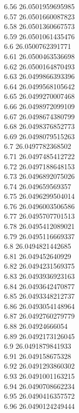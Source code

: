 {6.56	26.0501959695985\\
6.57	26.0501660087823\\
6.58	26.0501360667573\\
6.59	26.0501061435476\\
6.6	26.0500762391771\\
6.61	26.0500463536698\\
6.62	26.0500164870493\\
6.63	26.0499866393396\\
6.64	26.0499568105642\\
6.65	26.0499270007468\\
6.66	26.0498972099109\\
6.67	26.0498674380799\\
6.68	26.0498376852773\\
6.69	26.0498079515263\\
6.7	26.0497782368502\\
6.71	26.0497485412722\\
6.72	26.0497188648153\\
6.73	26.0496892075026\\
6.74	26.049659569357\\
6.75	26.0496299504014\\
6.76	26.0496003506586\\
6.77	26.0495707701513\\
6.78	26.0495412089021\\
6.79	26.0495116669337\\
6.8	26.0494821442685\\
6.81	26.049452640929\\
6.82	26.0494231569375\\
6.83	26.0493936923163\\
6.84	26.0493642470877\\
6.85	26.0493348212737\\
6.86	26.0493054148964\\
6.87	26.0492760279779\\
6.88	26.04924666054\\
6.89	26.0492173126045\\
6.9	26.0491879841933\\
6.91	26.049158675328\\
6.92	26.0491293860302\\
6.93	26.0491001163215\\
6.94	26.0490708662234\\
6.95	26.0490416357572\\
6.96	26.0490124249444\\
}

